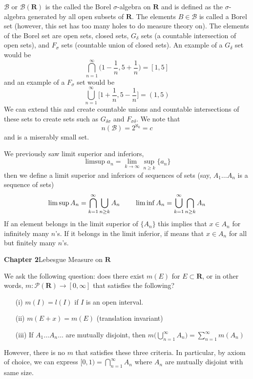 \vspace{2ex}
\begin{defi}
$\mathcal{B} $ or $\mathcal{B} ({\bm R})$ is the called the Borel $\sigma $-algebra on ${\bm R}$ and is defined as the $\sigma $-algebra generated by all open subsets of ${\bm R}$. The elements $B\in \mathcal{B} $ is called a Borel set (however, this set has too many holes to do measure theory on). The elements of the Borel set are open sets, closed sets, $G_{\delta }$ sets (a countable intersection of open sets), and $F_{\sigma }$ sets (countable union of closed sets). An example of a $G_{\delta }$ set would be
\[\bigcap^{\infty }_{n=1}\Big(1-\dfrac{1}{n},5+\dfrac{1}{n}\Big)=[1,5]\]
and an example of a $F_{\sigma }$ set would be
\[\bigcup^{\infty }_{n=1}\Big[1+\dfrac{1}{n},5-\dfrac{1}{n}\Big]=(1,5)\]
We can extend this and create countable unions and countable intersections of these sets to create sets such as $G_{\delta \sigma }$ and $F_{\sigma \delta }$. We note that
\[n(\mathcal{B} )=2^{\aleph_{0}}=c\]
and is a miserably small set.
\end{defi}
\vspace{2ex}
\begin{recall}
We previously saw limit superior and inferiors, 
\[\limsup a_{n}=\lim _{k\rightarrow \infty }\sup_{n\geq k} \{a_{n}\}\]
then we define a limit superior and inferiors of sequences of sets (say, $A_1\ldots A_{n}$ is a sequence of sets)
\[\limsup A_{n}=\bigcap ^{\infty }_{k=1}\bigcup_{n\geq k} A_{n} \hspace{5ex}\liminf A_{n}=\bigcup ^{\infty }_{k=1}\bigcap_{n\geq k} A_{n} \]
If an element belongs in the limit superior of $\{A_{n}\}$ this implies that $x\in A_{n}$ for infinitely many $n$'s. If it belongs in the limit inferior, if means that $x\in A_{n}$ for all but finitely many $n$'s.
\end{recall}
\vspace{2ex}
\textbf{Chapter 2}\hspace{2ex}Lebesgue Measure on ${\bm R}$
\\
\begin{rmk}
	We ask the following question: does there exist $m(E)$ for $E\subset {\bm R}$, or in other words, $m:\mathcal{P}({\bm R})\rightarrow [0,\infty ]$ that satisfies the following?
\begin{itemize}
	\item[(i)] $m(I)=l(I)$ if $I$ is an open interval.
	\item[(ii)] $m(E+x)=m(E)$ (translation invariant)
	\item[(iii)] If $A_1\ldots A_{n}\ldots $ are mutually disjoint, then $m\Big(\bigcup^{\infty }_{n=1}A_{n}\Big)=\sum ^{\infty }_{n=1}m(A_{n})$
\end{itemize}
However, there is no $m$ that satisfies these three criteria. In particular, by axiom of choice, we can express $[0,1)=\bigcap^{\infty }_{n=1}A_{n}$ where $A_{n}$ are mutually disjoint with same size.
\end{rmk}

